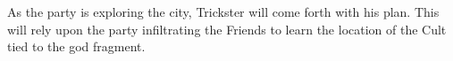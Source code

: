 As the party is exploring the city, Trickster will come forth with his plan.
This will rely upon the party infiltrating the Friends to learn the location of the Cult tied to the god fragment.